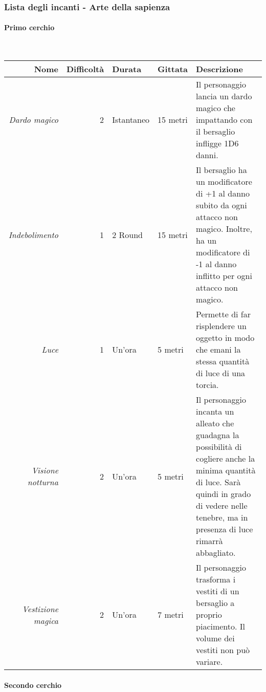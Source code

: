 \documentclass[../manuale_main.tex]{subfiles}
\begin{document}
\clearpage
\subsubsection{Lista degli incanti - Arte della sapienza}
\paragraph{Primo cerchio}\mbox{}\\

\begin{tabularx}{\linewidth}{|N| D| T| G| Y|}
\hline
\textbf{Nome} & \textbf{Difficoltà} & \textbf{Durata} & \textbf{Gittata} & \textbf{Descrizione} \\ \hline\hline
\textit{Dardo magico} & 2 & Istantaneo & 15 metri & Il personaggio lancia un dardo magico che impattando con il bersaglio infligge 1D6 danni. \\ \hline
\textit{Indebolimento} &1  &2 Round  & 15 metri  & Il bersaglio ha un modificatore di +1 al danno subito da ogni attacco non magico. Inoltre, ha un modificatore di -1 al danno inflitto per ogni attacco non magico.  \\ \hline
\textit{Luce} & 1 & Un'ora & 5 metri & Permette di far risplendere un oggetto in modo che emani la stessa quantità di luce di una torcia. \\ \hline
\textit{Visione notturna} &2  & Un'ora & 5 metri &  Il personaggio  incanta un alleato che guadagna la possibilità di cogliere anche la minima quantità di luce. Sarà quindi in grado di vedere nelle tenebre, ma in presenza di luce rimarrà abbagliato.\\ \hline
\textit{Vestizione magica} & 2 & Un'ora & 7 metri & Il personaggio trasforma i vestiti di un bersaglio a proprio piacimento. Il volume dei vestiti non può variare.\\
\hline
\end{tabularx}
\clearpage
\paragraph{Secondo cerchio}\mbox{}\\
\end{document}
